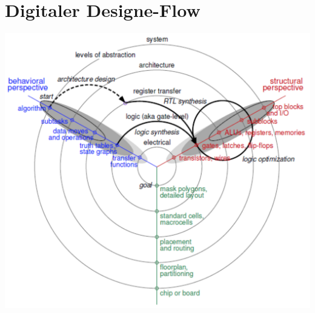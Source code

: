 \section{Digitaler Designe-Flow}

\begin{minipage}{0.35\textwidth}
	\includegraphics[width=\textwidth]{./bilder/Gajshi}
\end{minipage}
